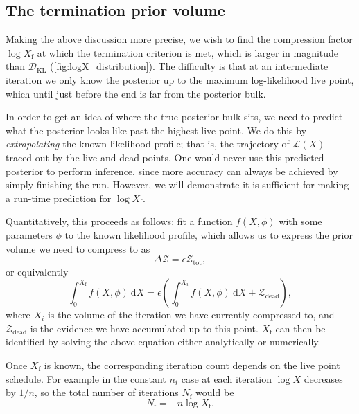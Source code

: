 \documentclass[usenatbib]{mnras}
\newcommand{\nlive}{n_i}
\newcommand{\Like}{\mathcal{L}}
\newcommand{\DKL}{\mathcal{D}_\mathrm{KL}}
\begin{document}
\subsection{The termination prior volume}
Making the above discussion more precise, we wish to find the compression factor $\log X_ \mathrm{f}$ at which the termination criterion is met, which is larger in magnitude than $\DKL$ (\cref{fig:logX_distribution}). The difficulty is that at an intermediate iteration we only know the posterior up to the maximum log-likelihood live point, which until just before the end is far from the posterior bulk. 
\par
In order to get an idea of where the true posterior bulk sits, we need to predict what the posterior looks like past the highest live point. We do this by \textit{extrapolating} the known likelihood profile; that is, the trajectory of $\Like(X)$ traced out by the live and dead points. 
One would never use this predicted posterior to perform inference, since more accuracy can always be achieved by simply finishing the run. However, we will demonstrate it is sufficient for making a run-time prediction for $\log X_\mathrm{f}$. 
\par
Quantitatively, this proceeds as follows: fit a function $f(X, \phi)$  with some parameters $\phi$ to the known likelihood profile, which allows us to express the prior volume we need to compress to as
\begin{equation}
	\Delta \mathcal{Z} = \epsilon \mathcal{Z}_\mathrm{tot},
\end{equation}
or equivalently
\begin{equation}\label{endpoint}
	\int_0^{X_\mathrm{f}} f(X, \phi)\ \mathrm{d}X = \epsilon \left( \int_0^{X_i} f(X, \phi)\ \mathrm{d}X + \mathcal{Z}_\mathrm{dead} \right),
\end{equation}
where $X_i$ is the volume of the iteration we have currently compressed to, and $\mathcal{Z}_\mathrm{dead}$ is the evidence we have accumulated up to this point. $X_\mathrm{f}$ can then be identified by solving the above equation either analytically or numerically. 
\par
Once $X_\mathrm{f}$ is known, the corresponding iteration count depends on the live point schedule. For example in the constant $\nlive$ case at each iteration $\log X$ decreases by $1/n$, so the total number of iterations $N_\mathrm{f}$ would be
\begin{equation}
	N_\mathrm{f} = - n\log X_\mathrm{f} .
\end{equation}
\end{document}
